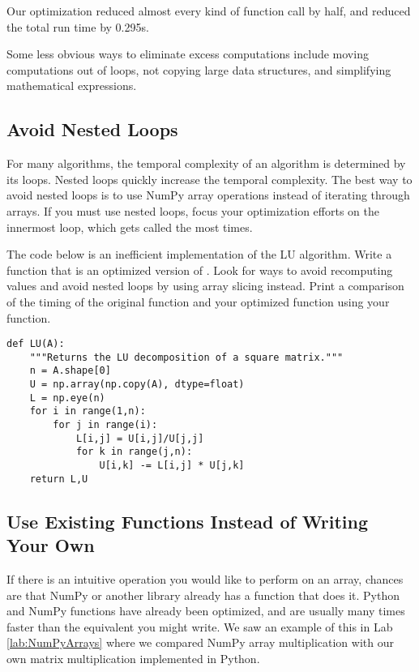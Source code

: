 Our optimization reduced almost every kind of function call by half, and reduced the total run time by 0.295s.

Some less obvious ways to eliminate excess computations include moving computations out of loops, not copying large data structures, and simplifying mathematical expressions.

\subsection*{Avoid Nested Loops}
For many algorithms, the temporal complexity of an algorithm is determined by its loops. Nested loops quickly increase the temporal complexity.
The best way to avoid nested loops is to use NumPy array operations instead of iterating through arrays.
If you must use nested loops, focus your optimization efforts on the innermost loop, which gets called the most times.

\begin{problem}
The code below is an inefficient implementation of the LU
algorithm. Write a function  that is an optimized
version of . Look for ways to avoid recomputing values
and avoid nested loops by using array slicing instead.
Print a comparison of the timing of the
original function and your optimized function using your
 function.
\begin{lstlisting}
def LU(A):
    """Returns the LU decomposition of a square matrix."""
    n = A.shape[0]
    U = np.array(np.copy(A), dtype=float)
    L = np.eye(n)
    for i in range(1,n):
        for j in range(i):
            L[i,j] = U[i,j]/U[j,j]
            for k in range(j,n):
                U[i,k] -= L[i,j] * U[j,k]
    return L,U
\end{lstlisting}
\end{problem}

\subsection*{Use Existing Functions Instead of Writing Your Own}
If there is an intuitive operation you would like to perform on an array, chances are that NumPy or another library already has a function that does it.
Python and NumPy functions have already been optimized, and are usually many times faster than the equivalent you might write.
We saw an example of this in Lab \ref{lab:NumPyArrays} where we compared NumPy array multiplication with our own matrix multiplication implemented in Python.

